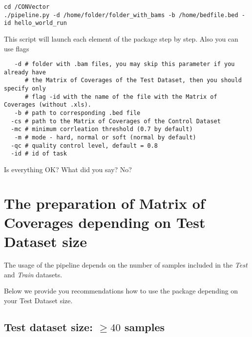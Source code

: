 \documentclass{article}
\begin{document}
\begin{lstlisting}[style=DOS, caption={Simple run of the package}]
cd /CONVector
./pipeline.py -d /home/folder/folder_with_bams -b /home/bedfile.bed -id hello_world_run 
\end{lstlisting}

This script will launch each element of the package step by step. Also you can use flags

\begin{verbatim}
   -d # folder with .bam files, you may skip this parameter if you already have 
      # the Matrix of Coverages of the Test Dataset, then you should specify only 
      # flag -id with the name of the file with the Matrix of Coverages (without .xls).
   -b # path to corresponding .bed file
  -cs # path to the Matrix of Coverages of the Control Dataset
  -mc # minimum corrleation threshold (0.7 by default)
   -m # mode - hard, normal or soft (normal by default)
  -qc # quality control level, default = 0.8
  -id # id of task
\end{verbatim}


Is everything OK? What did you say? No?





\newpage
\section{The preparation of Matrix of Coverages depending on Test Dataset size}

The usage of the pipeline depends on the number of samples included in the {\it Test} and {\it Train} datasets.



Below we provide you recommendations how to use the package depending on your Test Dataset size.




\subsection{Test dataset size: $\geq 40$ samples}
\end{document}
